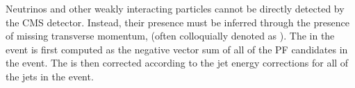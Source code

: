 Neutrinos and other weakly interacting particles cannot be directly detected by the CMS detector.
Instead, their presence must be inferred through the presence of missing transverse momentum, \ptmiss (often colloquially denoted as \met).
The \met in the event is first computed as the negative vector sum of all of the PF candidates in the event.
The \met is then corrected according to the jet energy corrections for all of the jets in the event.
